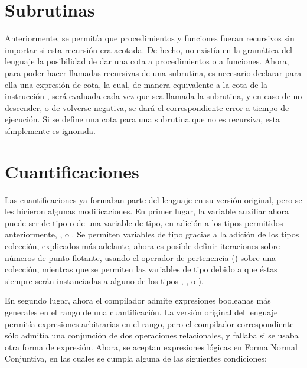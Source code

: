 \section{Subrutinas}

Anteriormente, se permitía que procedimientos y funciones fueran recursivos sin
importar si esta recursión era acotada. De hecho, no existía en la gramática del
lenguaje la posibilidad de dar una cota a procedimientos o a funciones. Ahora,
para poder hacer llamadas recursivas de una subrutina, es necesario declarar
para ella una expresión de cota, la cual, de manera equivalente a la cota de la
instrucción , será evaluada cada vez que sea llamada la subrutina, y
en caso de no descender, o de volverse negativa, se dará el correspondiente
error a tiempo de ejecución. Si se define una cota para una subrutina que no es
recursiva, esta símplemente es ignorada.

\section{Cuantificaciones}

Las cuantificaciones ya formaban parte del lenguaje en su versión original, pero
se les hicieron algunas modificaciones. En primer lugar, la variable auxiliar
ahora puede ser de tipo  o de una variable de tipo, en adición a
los tipos permitidos anteriormente,  ,  o
. Se permiten variables de tipo  gracias a la
adición de los tipos colección, explicados más adelante, ahora es posible
definir iteraciones sobre números de punto flotante, usando el operador de
pertenencia (\Elem) sobre una colección, mientras que se permiten las variables
de tipo debido a que éstas siempre serán instanciadas a alguno de los
tipos , ,  o ).

En segundo lugar, ahora el compilador admite expresiones booleanas más generales
en el rango de una cuantificación. La versión original del lenguaje permitía
expresiones arbitrarias en el rango, pero el compilador correspondiente sólo
admitía una conjunción de dos operaciones relacionales, y fallaba si se usaba
otra forma de expresión. Ahora, se aceptan expresiones lógicas en Forma Normal
Conjuntiva, en las cuales se cumpla alguna de las siguientes condiciones:

